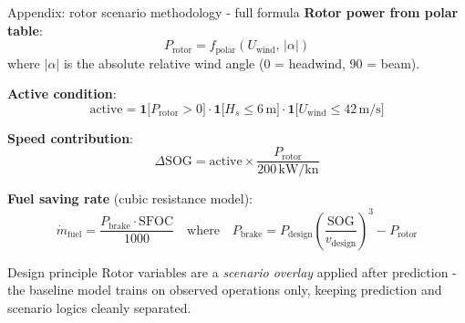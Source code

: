 \documentclass[aspectratio=169,10pt]{beamer}
\begin{document}
\begin{frame}[noframenumbering]{Appendix: rotor scenario methodology - full formula}
\small
\textbf{Rotor power from polar table}:
\[
  P_\text{rotor} = f_\text{polar}(U_\text{wind},\, |\alpha|)
\]
where $|\alpha|$ is the absolute relative wind angle (0 = headwind, 90 = beam).

\textbf{Active condition}:
\[
  \text{active} = \mathbf{1}\bigl[P_\text{rotor}>0\bigr]\cdot\mathbf{1}\bigl[H_s \leq 6\,\text{m}\bigr]\cdot\mathbf{1}\bigl[U_\text{wind} \leq 42\,\text{m/s}\bigr]
\]

\textbf{Speed contribution}:
\[
  \Delta\text{SOG} = \text{active} \times \frac{P_\text{rotor}}{200\,\text{kW/kn}}
\]

\textbf{Fuel saving rate} (cubic resistance model):
\[
  \dot{m}_\text{fuel} = \frac{P_\text{brake} \cdot \text{SFOC}}{1000}
  \quad\text{where}\quad
  P_\text{brake} = P_\text{design}\left(\frac{\text{SOG}}{v_\text{design}}\right)^3 - P_\text{rotor}
\]

\begin{block}{Design principle}
Rotor variables are a \emph{scenario overlay} applied after prediction - the baseline model trains on observed operations only, keeping prediction and scenario logics cleanly separated.
\end{block}
\end{frame}
\end{document}
